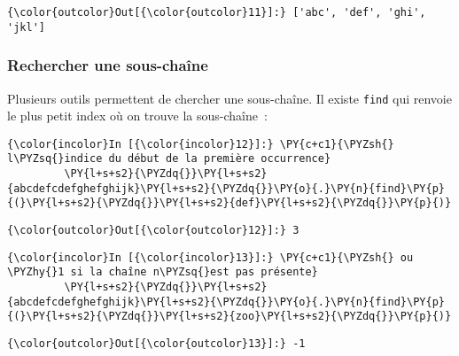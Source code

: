 \begin{Verbatim}[commandchars=\\\{\},frame=single,framerule=0.3mm,rulecolor=\color{cellframecolor}]
{\color{outcolor}Out[{\color{outcolor}11}]:} ['abc', 'def', 'ghi', 'jkl']
\end{Verbatim}
            
    \hypertarget{rechercher-une-sous-chauxeene}{%
\subsubsection{Rechercher une
sous-chaîne}\label{rechercher-une-sous-chauxeene}}

    Plusieurs outils permettent de chercher une sous-chaîne. Il existe
\texttt{find} qui renvoie le plus petit index où on trouve la
sous-chaîne~:

    \begin{Verbatim}[commandchars=\\\{\},frame=single,framerule=0.3mm,rulecolor=\color{cellframecolor}]
{\color{incolor}In [{\color{incolor}12}]:} \PY{c+c1}{\PYZsh{} l\PYZsq{}indice du début de la première occurrence}
         \PY{l+s+s2}{\PYZdq{}}\PY{l+s+s2}{abcdefcdefghefghijk}\PY{l+s+s2}{\PYZdq{}}\PY{o}{.}\PY{n}{find}\PY{p}{(}\PY{l+s+s2}{\PYZdq{}}\PY{l+s+s2}{def}\PY{l+s+s2}{\PYZdq{}}\PY{p}{)}
\end{Verbatim}


\begin{Verbatim}[commandchars=\\\{\},frame=single,framerule=0.3mm,rulecolor=\color{cellframecolor}]
{\color{outcolor}Out[{\color{outcolor}12}]:} 3
\end{Verbatim}
            
    \begin{Verbatim}[commandchars=\\\{\},frame=single,framerule=0.3mm,rulecolor=\color{cellframecolor}]
{\color{incolor}In [{\color{incolor}13}]:} \PY{c+c1}{\PYZsh{} ou \PYZhy{}1 si la chaîne n\PYZsq{}est pas présente}
         \PY{l+s+s2}{\PYZdq{}}\PY{l+s+s2}{abcdefcdefghefghijk}\PY{l+s+s2}{\PYZdq{}}\PY{o}{.}\PY{n}{find}\PY{p}{(}\PY{l+s+s2}{\PYZdq{}}\PY{l+s+s2}{zoo}\PY{l+s+s2}{\PYZdq{}}\PY{p}{)}
\end{Verbatim}


\begin{Verbatim}[commandchars=\\\{\},frame=single,framerule=0.3mm,rulecolor=\color{cellframecolor}]
{\color{outcolor}Out[{\color{outcolor}13}]:} -1
\end{Verbatim}
            
